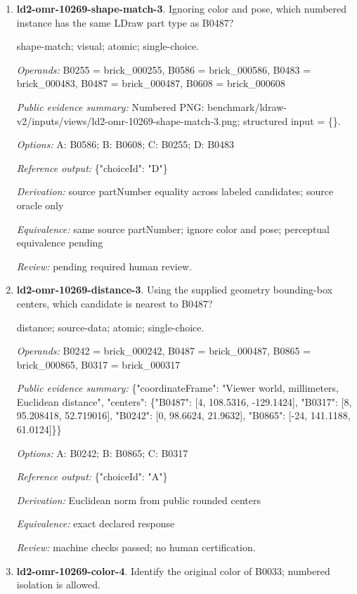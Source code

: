 \begin{enumerate}
\item \textbf{ld2-omr-10269-shape-match-3}. Ignoring color and pose, which numbered instance has the same LDraw part type as B0487?
\par{\small shape-match; visual; atomic; single-choice.\par\textit{Operands:} B0255 = brick\_000255, B0586 = brick\_000586, B0483 = brick\_000483, B0487 = brick\_000487, B0608 = brick\_000608\par\textit{Public evidence summary:} Numbered PNG: benchmark/ldraw-v2/inputs/views/ld2-omr-10269-shape-match-3.png; structured input = \{\}.\par\textit{Options:} A: B0586; B: B0608; C: B0255; D: B0483\par\textit{Reference output:} \{"choiceId": "D"\}\par\textit{Derivation:} source partNumber equality across labeled candidates; source oracle only\par\textit{Equivalence:} same source partNumber; ignore color and pose; perceptual equivalence pending\par\textit{Review:} pending required human review.}
\item \textbf{ld2-omr-10269-distance-3}. Using the supplied geometry bounding-box centers, which candidate is nearest to B0487?
\par{\small distance; source-data; atomic; single-choice.\par\textit{Operands:} B0242 = brick\_000242, B0487 = brick\_000487, B0865 = brick\_000865, B0317 = brick\_000317\par\textit{Public evidence summary:} \{"coordinateFrame": "Viewer world, millimeters, Euclidean distance", "centers": \{"B0487": [4, 108.5316, -129.1424], "B0317": [8, 95.208418, 52.719016], "B0242": [0, 98.6624, 21.9632], "B0865": [-24, 141.1188, 61.0124]\}\}\par\textit{Options:} A: B0242; B: B0865; C: B0317\par\textit{Reference output:} \{"choiceId": "A"\}\par\textit{Derivation:} Euclidean norm from public rounded centers\par\textit{Equivalence:} exact declared response\par\textit{Review:} machine checks passed; no human certification.}
\item \textbf{ld2-omr-10269-color-4}. Identify the original color of B0033; numbered isolation is allowed.

\end{enumerate}
